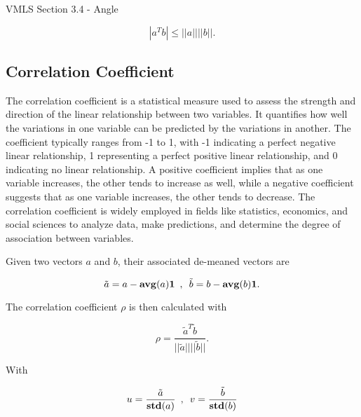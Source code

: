 \begin{notes}{VMLS Section 3.4 - Angle}
\begin{Highlight}
        \begin{equation*}
            |a^{T}b| \leq ||a|| ||b||.
        \end{equation*}
    \end{Highlight}

    \subsection*{Correlation Coefficient}

    The correlation coefficient is a statistical measure used to assess the strength and direction of the linear relationship between two variables. It quantifies how well the variations in one variable can be predicted by the 
    variations in another. The coefficient typically ranges from -1 to 1, with -1 indicating a perfect negative linear relationship, 1 representing a perfect positive linear relationship, and 0 indicating no linear relationship. 
    A positive coefficient implies that as one variable increases, the other tends to increase as well, while a negative coefficient suggests that as one variable increases, the other tends to decrease. The correlation coefficient 
    is widely employed in fields like statistics, economics, and social sciences to analyze data, make predictions, and determine the degree of association between variables.

    \begin{Highlight}
        Given two vectors $a$ and $b$, their associated de-meaned vectors are

        \begin{equation*}
            \tilde{a} = a - \mathbf{avg}(a)\mathbf{1} \hspace*{5pt} , \hspace*{5pt} \tilde{b} = b - \mathbf{avg}(b)\mathbf{1}.
        \end{equation*}

        The correlation coefficient $\rho$ is then calculated with 

        \begin{equation*}
            \rho = \frac{\tilde{a}^{T}\tilde{b}}{||\tilde{a}|| ||\tilde{b}||}.
        \end{equation*}

        With 

        \begin{equation*}
            u = \frac{\tilde{a}}{\mathbf{std}(a)} \hspace*{5pt} , \hspace*{5pt} v = \frac{\tilde{b}}{\mathbf{std}(b)}
        \end{equation*}


\end{Highlight}
\end{notes}

